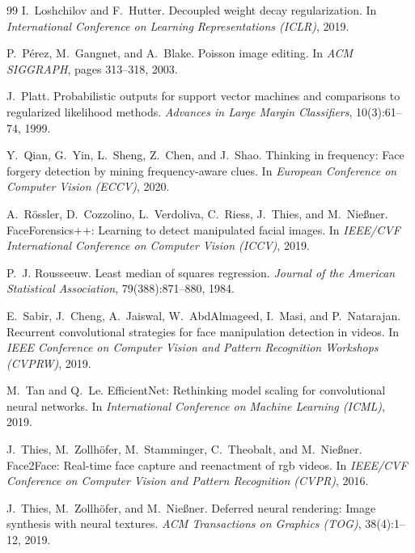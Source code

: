 \documentclass[10pt,twocolumn,letterpaper]{article}
\begin{document}
\begin{thebibliography}{99}
I.~Loshchilov and F.~Hutter.
\newblock Decoupled weight decay regularization.
\newblock In \emph{International Conference on Learning Representations (ICLR)}, 2019.

P.~P{\'e}rez, M.~Gangnet, and A.~Blake.
\newblock Poisson image editing.
\newblock In \emph{ACM SIGGRAPH}, pages 313--318, 2003.

J.~Platt.
\newblock Probabilistic outputs for support vector machines and comparisons to regularized likelihood methods.
\newblock \emph{Advances in Large Margin Classifiers}, 10(3):61--74, 1999.

Y.~Qian, G.~Yin, L.~Sheng, Z.~Chen, and J.~Shao.
\newblock Thinking in frequency: Face forgery detection by mining frequency-aware clues.
\newblock In \emph{European Conference on Computer Vision (ECCV)}, 2020.

A.~R{\"o}ssler, D.~Cozzolino, L.~Verdoliva, C.~Riess, J.~Thies, and M.~Nie{\ss}ner.
\newblock Face{F}orensics++: Learning to detect manipulated facial images.
\newblock In \emph{IEEE/CVF International Conference on Computer Vision (ICCV)}, 2019.

P.~J. Rousseeuw.
\newblock Least median of squares regression.
\newblock \emph{Journal of the American Statistical Association}, 79(388):871--880, 1984.

E.~Sabir, J.~Cheng, A.~Jaiswal, W.~AbdAlmageed, I.~Masi, and P.~Natarajan.
\newblock Recurrent convolutional strategies for face manipulation detection in videos.
\newblock In \emph{IEEE Conference on Computer Vision and Pattern Recognition Workshops (CVPRW)}, 2019.

M.~Tan and Q.~Le.
\newblock Efficient{N}et: Rethinking model scaling for convolutional neural networks.
\newblock In \emph{International Conference on Machine Learning (ICML)}, 2019.

J.~Thies, M.~Zollh{\"o}fer, M.~Stamminger, C.~Theobalt, and M.~Nie{\ss}ner.
\newblock Face2{F}ace: Real-time face capture and reenactment of rgb videos.
\newblock In \emph{IEEE/CVF Conference on Computer Vision and Pattern Recognition (CVPR)}, 2016.

J.~Thies, M.~Zollh{\"o}fer, and M.~Nie{\ss}ner.
\newblock Deferred neural rendering: Image synthesis with neural textures.
\newblock \emph{ACM Transactions on Graphics (TOG)}, 38(4):1--12, 2019.


\end{thebibliography}
\end{document}
